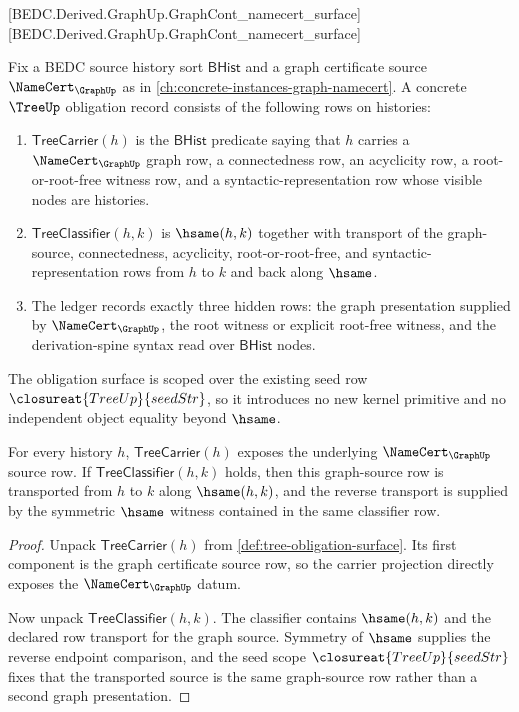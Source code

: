 [BEDC.Derived.GraphUp.GraphCont\_namecert\_surface]
[BEDC.Derived.GraphUp.GraphCont\_namecert\_surface]

\begin{definition}\label{def:tree-obligation-surface}
Fix a BEDC source history sort $\mathsf{BHist}$ and a graph certificate source $\NameCert_{\GraphUp}$ as in \autoref{ch:concrete-instances-graph-namecert}. A concrete $\TreeUp$ obligation record consists of the following rows on histories:
\begin{enumerate}
  \item $\mathsf{TreeCarrier}(h)$ is the $\mathsf{BHist}$ predicate saying that $h$ carries a $\NameCert_{\GraphUp}$ graph row, a connectedness row, an acyclicity row, a root-or-root-free witness row, and a syntactic-representation row whose visible nodes are histories.
  \item $\mathsf{TreeClassifier}(h,k)$ is $\hsame(h,k)$ together with transport of the graph-source, connectedness, acyclicity, root-or-root-free, and syntactic-representation rows from $h$ to $k$ and back along $\hsame$.
  \item The ledger records exactly three hidden rows: the graph presentation supplied by $\NameCert_{\GraphUp}$, the root witness or explicit root-free witness, and the derivation-spine syntax read over $\mathsf{BHist}$ nodes.
\end{enumerate}
The obligation surface is scoped over the existing seed row $\closureat{TreeUp}{seedStr}$, so it introduces no new kernel primitive and no independent object equality beyond $\hsame$.
\end{definition}

\begin{theorem}\label{thm:tree-graph-source-obligation}
For every history $h$, $\mathsf{TreeCarrier}(h)$ exposes the underlying $\NameCert_{\GraphUp}$ source row. If $\mathsf{TreeClassifier}(h,k)$ holds, then this graph-source row is transported from $h$ to $k$ along $\hsame(h,k)$, and the reverse transport is supplied by the symmetric $\hsame$ witness contained in the same classifier row.
\end{theorem}
\begin{proof}
Unpack $\mathsf{TreeCarrier}(h)$ from \autoref{def:tree-obligation-surface}. Its first component is the graph certificate source row, so the carrier projection directly exposes the $\NameCert_{\GraphUp}$ datum.

Now unpack $\mathsf{TreeClassifier}(h,k)$. The classifier contains $\hsame(h,k)$ and the declared row transport for the graph source. Symmetry of $\hsame$ supplies the reverse endpoint comparison, and the seed scope $\closureat{TreeUp}{seedStr}$ fixes that the transported source is the same graph-source row rather than a second graph presentation.
\end{proof}

